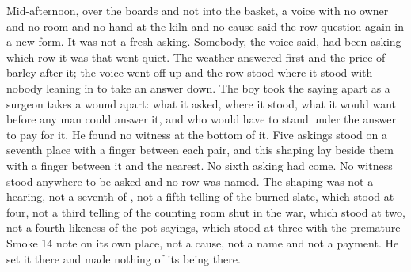 Mid-afternoon, over the boards and not into the basket, a voice with no owner and no room and no hand at the kiln and no cause said the row question again in a new form. It was not a fresh asking. Somebody, the voice said, had been asking which row it was that went quiet. The weather answered first and the price of barley after it; the voice went off up  and the row stood where it stood with nobody leaning in to take an answer down. The boy took the saying apart as a surgeon takes a wound apart: what it asked, where it stood, what it would want before any man could answer it, and who would have to stand under the answer to pay for it. He found no witness at the bottom of it. Five askings stood on a seventh place with a finger between each pair, and this shaping lay beside them with a finger between it and the nearest. No sixth asking had come. No witness stood anywhere to be asked and no row was named. The shaping was not a hearing, not a seventh of , not a fifth telling of the burned slate, which stood at four, not a third telling of the counting room shut in the war, which stood at two, not a fourth likeness of the pot sayings, which stood at three with the premature Smoke 14 note on its own place, not a cause, not a name and not a payment. He set it there and made nothing of its being there.

\scenebreak

